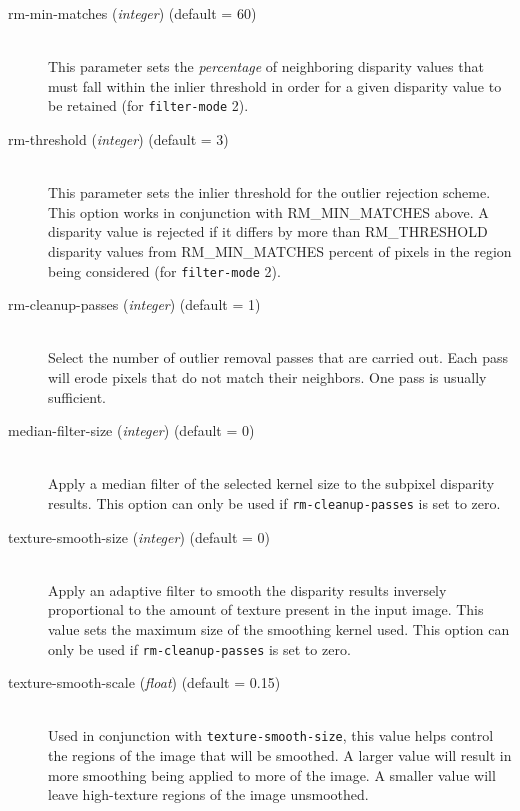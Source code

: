 \begin{description}
\item[rm-min-matches \textnormal{\small{(\emph{integer})}} (default = 60)] \hfill \\
  This parameter sets the {\em percentage} of neighboring disparity
  values that must fall within the inlier threshold in order for a
  given disparity value to be retained (for \texttt{filter-mode} 2).

\item[rm-threshold \textnormal{\small{(\emph{integer})}} (default = 3)] \hfill \\
  This parameter sets the inlier threshold for the outlier rejection
  scheme.  This option works in conjunction with RM\_MIN\_MATCHES
  above.  A disparity value is rejected if it differs by more than
  RM\_THRESHOLD disparity values from RM\_MIN\_MATCHES percent of
  pixels in the region being considered  (for \texttt{filter-mode} 2).

\item[rm-cleanup-passes \textnormal{\small{(\emph{integer})}} (default = 1)] \hfill \\
  Select the number of outlier removal passes that are carried out.
  Each pass will erode pixels that do not match their neighbors.  One
  pass is usually sufficient.

\item[median-filter-size \textnormal{\small{(\emph{integer})}} (default = 0)] \hfill \\
  Apply a median filter of the selected kernel size to the subpixel disparity results.
  This option can only be used if \texttt{rm-cleanup-passes} is set to zero.

\item[texture-smooth-size \textnormal{\small{(\emph{integer})}} (default = 0)] \hfill \\
  Apply an adaptive filter to smooth the disparity results inversely proportional to
  the amount of texture present in the input image.  This value sets the maximum size 
  of the smoothing kernel used.
  This option can only be used if \texttt{rm-cleanup-passes} is set to zero.

\item[texture-smooth-scale \textnormal{\small{(\emph{float})}} (default = 0.15)] \hfill \\
  Used in conjunction with \texttt{texture-smooth-size}, this value helps control the 
  regions of the image that will be smoothed.  A larger value will result in more 
  smoothing being applied to more of the image.  A smaller value will leave high-texture
  regions of the image unsmoothed.


\end{description}
